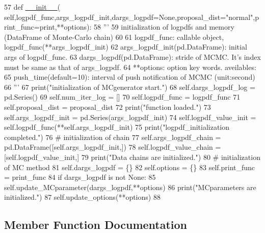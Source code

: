 \begin{DoxyCode}
57     \textcolor{keyword}{def }\hyperlink{classsampler_1_1Sampler_a0ebbb93e5c948bc426658cbdc92bfd12}{\_\_init\_\_}(
      self,logpdf\_func,args\_logpdf\_init,dargs\_logpdf=None,proposal\_dist="normal",print\_func=print,**options):
58         \textcolor{stringliteral}{'''}
59 \textcolor{stringliteral}{        initialization of logpdfs and memory (DataFrame of Monte-Carlo chain)}
60 \textcolor{stringliteral}{}
61 \textcolor{stringliteral}{        logpdf\_func: callable object, logpdf\_func(**args\_logpdf\_init)}
62 \textcolor{stringliteral}{        args\_logpdf\_init(pd.DataFrame): initial args of logpdf\_func.}
63 \textcolor{stringliteral}{        dargs\_logpdf(pd.DataFrame): stride of MCMC. It's index must be same as that of args\_logpdf.}
64 \textcolor{stringliteral}{        **options: option key words. aveilables:}
65 \textcolor{stringliteral}{            push\_time(default=10): interval of push notification of MCMC (unit:second)}
66 \textcolor{stringliteral}{        '''}
67         print(\textcolor{stringliteral}{"initialization of MCgenerator start."})
68         self.dargs\_logpdf\_log = pd.Series()
69         self.num\_iter\_log = []
70         self.logpdf\_func = logpdf\_func
71         self.proposal\_dist = proposal\_dist
72         print(\textcolor{stringliteral}{"function loaded."})
73         self.args\_logpdf\_init = pd.Series(args\_logpdf\_init)
74         self.logpdf\_value\_init = self.logpdf\_func(**self.args\_logpdf\_init)
75         print(\textcolor{stringliteral}{"logpdf\_initialization completed."})
76         \textcolor{comment}{# initialization of chain}
77         self.args\_logpdf\_chain = pd.DataFrame([self.args\_logpdf\_init,])
78         self.logpdf\_value\_chain = [self.logpdf\_value\_init,]
79         print(\textcolor{stringliteral}{"Data chains are initialized."})
80         \textcolor{comment}{# initialization of MC method}
81         self.dargs\_logpdf = \{\}
82         self.options = \{\}
83         self.print\_func = print\_func
84         \textcolor{keywordflow}{if} dargs\_logpdf \textcolor{keywordflow}{is} \textcolor{keywordflow}{not} \textcolor{keywordtype}{None}:
85             self.update\_MCparameter(dargs\_logpdf,**options)
86             print(\textcolor{stringliteral}{"MCparameters are initialized."})
87         self.update\_options(**options)
88    
\end{DoxyCode}


\subsection{Member Function Documentation}
\mbox{\label{classmcgenerator_1_1MCgenerator_a242f49dce70773d317ffde2988c92c66}} 
